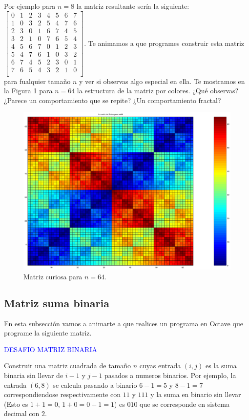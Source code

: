 Por ejemplo para $n=8$ la matriz resultante sería la siguiente:
{\tiny $\begin{bmatrix}
0 & 1 & 2 & 3 & 4 & 5 & 6 & 7\\
1 & 0 & 3 & 2 & 5 & 4 & 7 & 6\\
2 & 3 & 0 & 1 & 6 & 7 & 4 & 5\\
3 & 2 & 1 & 0 & 7 & 6 & 5 & 4\\
4 & 5 & 6 & 7 & 0 & 1 & 2 & 3\\
5 & 4 & 7 & 6 & 1 & 0 & 3 & 2\\
6 & 7 & 4 & 5 & 2 & 3 & 0 & 1\\
7 & 6 & 5 & 4 & 3 & 2 & 1 & 0\\
\end{bmatrix}
$}.  Te animamos a que programes construir esta matriz para fualquier
tamaño $n$ y ver si observas algo especial en ella. Te mostramos en la
Figura \ref{ruben} para $n=64$ la estructura de la matriz por
colores. ¿Qué observas? ¿Parece un comportamiento que se repite? ¿Un
comportamiento fractal?
\begin{center}\begin{figure}[ht!]
\centering \includegraphics[scale=0.25]{MatrizRuben.eps}\caption{Matriz curiosa para $n=64$.}\label{ruben}
\end{figure}\end{center}

\subsection{Matriz suma binaria}
En esta subsección vamos a animarte a que realices un programa en Octave que programe la siguiente matriz.
\begin{mybox}
 \begin{center}\textcolor{blue}{DESAFIO MATRIZ BINARIA}\end{center}
 Construir una matriz cuadrada de tamaño $n$ cuyas entrada $(i,j)$ es la suma binaria sin llevar de $i-1$ y $j-1$ pasados a numeros binarios. Por ejemplo, la entrada $(6,8)$ se calcula pasando a binario  $6-1=5$ y $8-1=7$ correspondiendose respectivamente  con $11$ y $111$ y la suma en binario sin llevar (Esto es $1+1=0$, $1+0=0+1=1$) es $010$ que se corresponde en sistema decimal con $2$.
\end{mybox}

